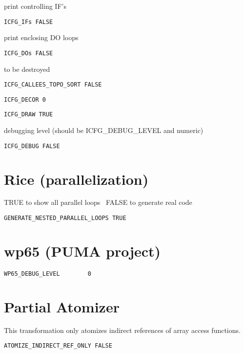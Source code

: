print controlling IF's

\begin{verbatim}
ICFG_IFs FALSE
\end{verbatim}

print enclosing DO loops

\begin{verbatim}
ICFG_DOs FALSE
\end{verbatim}

to be destroyed

\begin{verbatim}
ICFG_CALLEES_TOPO_SORT FALSE
\end{verbatim}

\begin{verbatim}
ICFG_DECOR 0
\end{verbatim}

\begin{verbatim}
ICFG_DRAW TRUE
\end{verbatim}

debugging level (should be ICFG\_DEBUG\_LEVEL and numeric)

\begin{verbatim}
ICFG_DEBUG FALSE
\end{verbatim}

\section{Rice (parallelization)}

TRUE to show all parallel loops  \
FALSE to generate real code

\begin{verbatim}
GENERATE_NESTED_PARALLEL_LOOPS TRUE
\end{verbatim}

\section{wp65 (PUMA project)}

\begin{verbatim}
WP65_DEBUG_LEVEL        0
\end{verbatim}

\section{Partial Atomizer}

This transformation only atomizes indirect references of array access functions.


\begin{verbatim}
ATOMIZE_INDIRECT_REF_ONLY FALSE
\end{verbatim}

